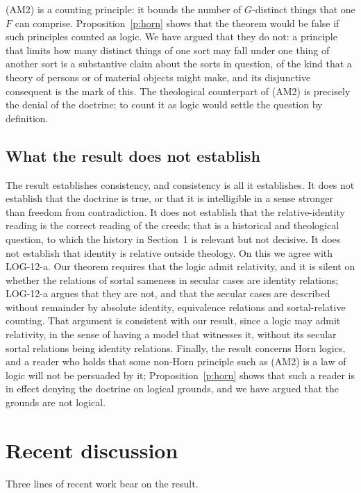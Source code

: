 \documentclass{situationist-preprint}
\begin{document}
(AM2) is a counting principle: it bounds the number of $G$-distinct things that one $F$ can comprise. Proposition~\ref{p:horn} shows that the theorem would be false if such principles counted as logic. We have argued that they do not: a principle that limits how many distinct things of one sort may fall under one thing of another sort is a substantive claim about the sorts in question, of the kind that a theory of persons or of material objects might make, and its disjunctive consequent is the mark of this. The theological counterpart of (AM2) is precisely the denial of the doctrine; to count it as logic would settle the question by definition.

\subsection{What the result does not establish}

The result establishes consistency, and consistency is all it establishes. It does not establish that the doctrine is true, or that it is intelligible in a sense stronger than freedom from contradiction. It does not establish that the relative-identity reading is the correct reading of the creeds; that is a historical and theological question, to which the history in Section~1 is relevant but not decisive. It does not establish that identity is relative outside theology. On this we agree with LOG-12-a. Our theorem requires that the logic admit relativity, and it is silent on whether the relations of sortal sameness in secular cases are identity relations; LOG-12-a argues that they are not, and that the secular cases are described without remainder by absolute identity, equivalence relations and sortal-relative counting. That argument is consistent with our result, since a logic may admit relativity, in the sense of having a model that witnesses it, without its secular sortal relations being identity relations. Finally, the result concerns Horn logics, and a reader who holds that some non-Horn principle such as (AM2) is a law of logic will not be persuaded by it; Proposition~\ref{p:horn} shows that such a reader is in effect denying the doctrine on logical grounds, and we have argued that the grounds are not logical.

\section{Recent discussion}

Three lines of recent work bear on the result.
\end{document}
